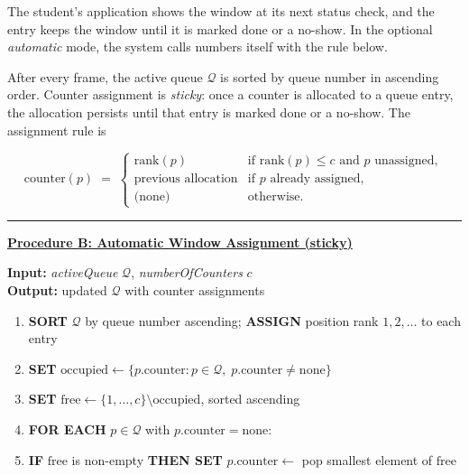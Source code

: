 \noindent The student's application shows the window at its next
status check, and the entry keeps the window until it is marked done or
a no-show. In the optional \emph{automatic} mode, the system calls
numbers itself with the rule below.

After every frame, the active queue $\mathcal{Q}$ is sorted by queue
number in ascending order. Counter assignment is \emph{sticky}: once a
counter is allocated to a queue entry, the allocation persists until
that entry is marked done or a no-show. The assignment rule is

\begin{equation}
\text{counter}(p) \;=\;
\begin{cases}
\text{rank}(p) & \text{if } \text{rank}(p) \leq c
                 \text{ and } p \text{ unassigned}, \\
\text{previous allocation} & \text{if } p \text{ already assigned}, \\
\text{(none)} & \text{otherwise.}
\end{cases}
\label{eq:counter}
\end{equation}

\vspace{0.5em}
\noindent\rule{\linewidth}{0.8pt}

\noindent\textbf{\underline{Procedure B: Automatic Window Assignment
(sticky)}}

\noindent\textbf{Input:} \textit{activeQueue} $\mathcal{Q}$,
\textit{numberOfCounters} $c$\\
\noindent\textbf{Output:} updated $\mathcal{Q}$ with counter
assignments

\begin{enumerate}
  \item \textbf{SORT} $\mathcal{Q}$ by queue number ascending;
        \textbf{ASSIGN} position rank $1, 2, \ldots$ to each entry
  \item \textbf{SET} $\mathrm{occupied} \gets
        \{p.\text{counter} : p \in \mathcal{Q},\;
        p.\text{counter} \neq \text{none}\}$
  \item \textbf{SET} $\mathrm{free} \gets \{1,\ldots,c\}
        \setminus \mathrm{occupied}$, sorted ascending
  \item \textbf{FOR EACH} $p \in \mathcal{Q}$ with
        $p.\text{counter} = \text{none}$:
  \item \quad \textbf{IF} $\mathrm{free}$ is non-empty
        \textbf{THEN SET} $p.\text{counter} \gets$
        pop smallest element of $\mathrm{free}$
\end{enumerate}
\vspace{0.3em}

